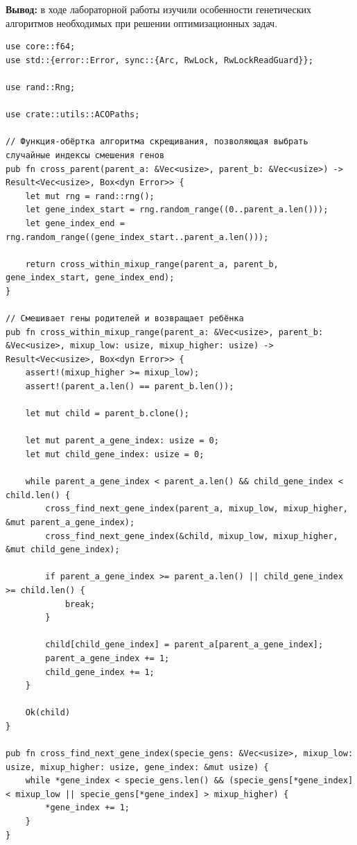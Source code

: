 \documentclass[a4paper,14pt]{extarticle}
\begin{document}
\textbf{Вывод: } в ходе лабораторной работы изучили особенности генетических алгоритмов необходимых при решении оптимизационных задач.

\begin{verbatim}
use core::f64;
use std::{error::Error, sync::{Arc, RwLock, RwLockReadGuard}};

use rand::Rng;

use crate::utils::ACOPaths;

// Функция-обёртка алгоритма скрещивания, позволяющая выбрать случайные индексы смешения генов
pub fn cross_parent(parent_a: &Vec<usize>, parent_b: &Vec<usize>) -> Result<Vec<usize>, Box<dyn Error>> {
    let mut rng = rand::rng();
    let gene_index_start = rng.random_range((0..parent_a.len()));
    let gene_index_end = rng.random_range((gene_index_start..parent_a.len()));

    return cross_within_mixup_range(parent_a, parent_b, gene_index_start, gene_index_end);
}

// Смешивает гены родителей и возвращает ребёнка
pub fn cross_within_mixup_range(parent_a: &Vec<usize>, parent_b: &Vec<usize>, mixup_low: usize, mixup_higher: usize) -> Result<Vec<usize>, Box<dyn Error>> {
    assert!(mixup_higher >= mixup_low);
    assert!(parent_a.len() == parent_b.len());

    let mut child = parent_b.clone();

    let mut parent_a_gene_index: usize = 0;
    let mut child_gene_index: usize = 0;

    while parent_a_gene_index < parent_a.len() && child_gene_index < child.len() {
        cross_find_next_gene_index(parent_a, mixup_low, mixup_higher, &mut parent_a_gene_index);
        cross_find_next_gene_index(&child, mixup_low, mixup_higher, &mut child_gene_index);

        if parent_a_gene_index >= parent_a.len() || child_gene_index >= child.len() {
            break;
        }

        child[child_gene_index] = parent_a[parent_a_gene_index];
        parent_a_gene_index += 1;
        child_gene_index += 1;
    }

    Ok(child)
}

pub fn cross_find_next_gene_index(specie_gens: &Vec<usize>, mixup_low: usize, mixup_higher: usize, gene_index: &mut usize) {
    while *gene_index < specie_gens.len() && (specie_gens[*gene_index] < mixup_low || specie_gens[*gene_index] > mixup_higher) {
        *gene_index += 1;
    }
}


\end{verbatim}
\end{document}
